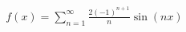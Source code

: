 \documentclass[preview]{standalone}
\begin{document}
\begin{align*}
f(x) = \sum_{n=1}^{\infty} \frac{2(-1)^{n+1}}{n} \sin(nx)
\end{align*}
\end{document}
